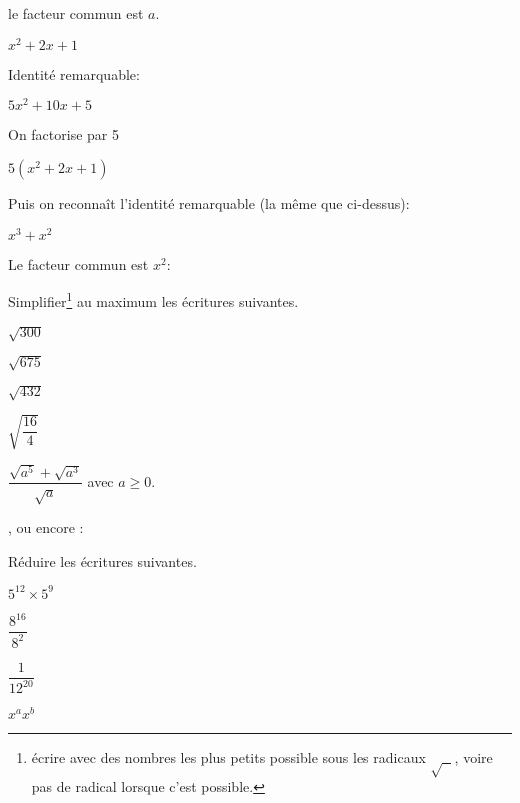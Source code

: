 \documentclass[a4paper,12pt]{scrartcl}
\begin{document}
le facteur commun est $a$.


\question{} $x^{2} + 2x + 1$

Identité remarquable:


\question{} $5x^{2} + 10x + 5$

On factorise par 5 

$5(x^2 + 2x + 1)$

Puis on reconnaît l'identité remarquable (la même que ci-dessus):


\question{} $x^{3} + x^{2}$

Le facteur commun est $x^2$:



Simplifier\footnote{écrire avec des nombres les plus petits possible sous les radicaux $\sqrt{\mbox{ }}$, voire pas de radical lorsque c'est possible.} au maximum les écritures suivantes.

\question{} $\sqrt{300}$	


\question{} $\sqrt{675}$


\question{} $\sqrt{432}$


\question{} $\sqrt{\dfrac{16}{4}}$


\question{}  $\dfrac{\sqrt{a^{5}} + \sqrt{a^{3}}}{\sqrt{a}}$ avec $a \geqslant 0$.

, ou encore :




Réduire les écritures suivantes.

\question{} $5^{12} \times 5^{9}$


\question{} $\dfrac{8^{16}}{8^{2}}$


\question{} $\dfrac{1}{12^{20}}$


\question{} $x^{a} x^{b}$

\end{document}
